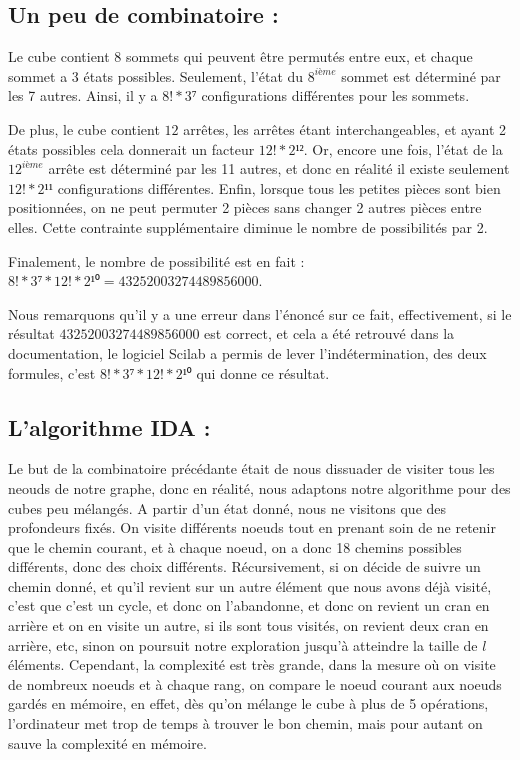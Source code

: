 \documentclass[a4paper,11pt]{article}
\theoremstyle{mytheor}
\begin{document}
\subsection{Un peu de combinatoire :}
Le cube contient 8 sommets qui peuvent être permutés entre eux, et chaque sommet a 3 états possibles. Seulement, l'état du $8^{ième}$ sommet est déterminé par les 7 autres. Ainsi, il y a $8 ! * 3⁷$ configurations différentes pour les sommets.

De plus, le cube contient $12$ arrêtes, les arrêtes étant interchangeables, et ayant 2 états possibles cela donnerait un facteur $12 ! * 2¹²$. Or, encore une fois, l'état de la $12^{ième}$ arrête est déterminé par les 11 autres, et donc en réalité il existe seulement $12 ! * 2¹¹$ configurations différentes.
Enfin, lorsque tous les petites pièces sont bien positionnées, on ne peut permuter 2 pièces sans changer 2 autres pièces entre elles. Cette contrainte supplémentaire diminue le nombre de possibilités par 2.

Finalement, le nombre de possibilité est en fait : $8 ! * 3⁷ * 12 ! * 2¹⁰ = 43252003274489856000.$

Nous remarquons qu'il y a une erreur dans l'énoncé sur ce fait, effectivement, si le résultat $43252003274489856000$ est correct, et cela a été retrouvé dans la documentation, le logiciel Scilab
a permis de lever l'indétermination, des deux formules, c'est $8 ! * 3⁷ * 12 ! * 2¹⁰$ qui donne ce
résultat.


\subsection{L'algorithme IDA : }
Le but de la combinatoire précédante était de nous dissuader de visiter tous les neouds de notre graphe, donc en réalité, nous adaptons notre algorithme pour des cubes peu mélangés. A partir d'un état donné, nous ne visitons que des profondeurs fixés. On visite différents noeuds tout en prenant soin de ne retenir que le chemin courant, et à chaque noeud, on a donc 18 chemins possibles différents, donc des choix différents. Récursivement, si on décide de suivre un chemin donné, et qu'il revient sur un autre élément que nous avons déjà visité, c'est que c'est un cycle, et donc on l'abandonne, et donc on revient un cran en arrière et on en visite un autre, si ils sont tous visités, on revient deux cran en arrière, etc, sinon on poursuit notre exploration jusqu'à atteindre la taille de $l$ éléments. Cependant, la complexité est très grande, dans la mesure où on visite de nombreux noeuds et à chaque rang, on compare le noeud courant aux noeuds gardés en mémoire, en effet, dès qu'on mélange le cube à plus de 5 opérations, l'ordinateur met trop de temps à trouver le bon chemin, mais pour autant on sauve la complexité en mémoire.
\end{document}
